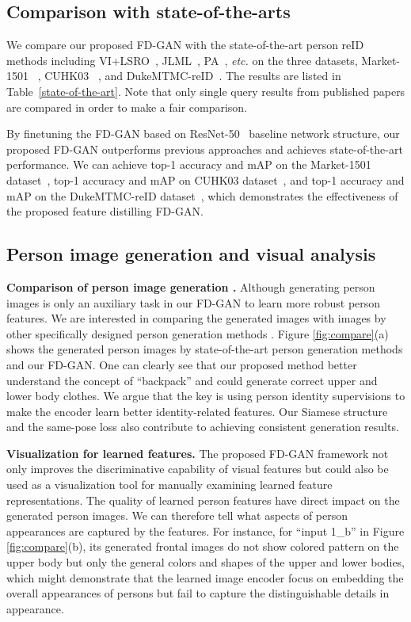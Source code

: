 \documentclass{article}
\begin{document}
\subsection{Comparison with state-of-the-arts}

We compare our proposed FD-GAN with the state-of-the-art person reID methods 
including VI+LSRO~\cite{zheng2017unlabeled}, JLML~\cite{li2017person}, PA~\cite{zhao2017deeply}, \textit{etc.}
on the three datasets, Market-1501~\cite{market} , CUHK03~\cite{cuhk} , and DukeMTMC-reID~\cite{duke}. The results are listed in Table~\ref{state-of-the-art}.
Note that only single query results from published papers are compared in order to make a fair comparison.

By finetuning the FD-GAN based on ResNet-50~\cite{he2016deep} baseline network structure, our proposed FD-GAN outperforms previous approaches and achieves state-of-the-art performance.
We can achieve  top-1 accuracy and  mAP on the Market-1501 dataset~\cite{market},  top-1 accuracy and  mAP on CUHK03 dataset~\cite{cuhk}, and  top-1 accuracy and  mAP on the DukeMTMC-reID dataset~\cite{duke}, which demonstrates the effectiveness of the proposed feature distilling FD-GAN.




\subsection{Person image generation and visual analysis}

\textbf{Comparison of person image generation \cite{ma2017pose, siarohin2017deformable}.} Although generating person images is only an auxiliary task in our FD-GAN to learn more robust person features. We are interested in comparing the generated images with images by other specifically designed person generation methods \cite{ma2017pose, siarohin2017deformable}. Figure \ref{fig:compare}(a) shows the generated person images by state-of-the-art person generation methods \cite{ma2017pose, siarohin2017deformable} and our FD-GAN. One can clearly see that our proposed method better understand the concept of ``backpack'' and could generate correct upper and lower body clothes. We argue that the key is using person identity supervisions to make the encoder learn better identity-related features. Our Siamese structure and the same-pose loss also contribute to achieving consistent generation results.

\textbf{Visualization for learned features.} The proposed FD-GAN framework not only improves the discriminative capability of visual features but could also be used as a visualization tool for manually examining learned feature representations. The quality of learned person features have direct impact on the generated person images. We can therefore tell what aspects of person appearances are captured by the features. For instance, for ``input 1\_b'' in Figure \ref{fig:compare}(b), its generated frontal images do not show colored pattern on the upper body but only the general colors and shapes of the upper and lower bodies, which might demonstrate that the learned image encoder focus on embedding the overall appearances of persons but fail to capture the distinguishable details in appearance.
\end{document}

